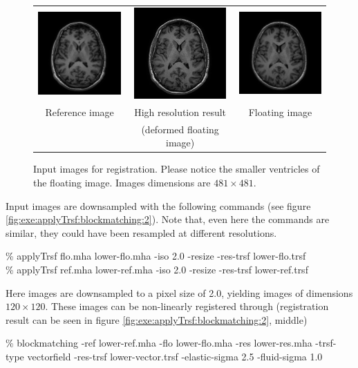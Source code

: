 \begin{figure}[ht]
\begin{center}
\begin{tabular}{ccc}
\includegraphics[width=35mm]{use-examples/applyTrsf-blockmatching/ref.png} &
\includegraphics[width=35mm]{use-examples/applyTrsf-blockmatching/res.png} & 
\includegraphics[width=35mm]{use-examples/applyTrsf-blockmatching/flo.png} \\
Reference image &
High resolution result &
Floating image \\
& (deformed floating image) &
\end{tabular}
\end{center}
\caption{\label{fig:exe:applyTrsf:blockmatching:1} Input images for registration. Please notice the smaller ventricles of the floating image. Images dimensions are $481 \times 481$.}
\end{figure}

Input images are downsampled with the following commands (see figure \ref{fig:exe:applyTrsf:blockmatching:2}). Note that, even here the commands are similar, they could have been resampled at different resolutions.
\begin{code}{1}
\% applyTrsf flo.mha lower-flo.mha -iso 2.0 -resize -res-trsf lower-flo.trsf \\
\% applyTrsf ref.mha lower-ref.mha -iso 2.0 -resize -res-trsf lower-ref.trsf
\end{code}
Here images are downsampled to a pixel size of 2.0, yielding images of dimensions $120 \times 120$. These images can be non-linearly registered through  (registration result can be seen in figure \ref{fig:exe:applyTrsf:blockmatching:2}, middle)
\begin{code}{1}
\% blockmatching -ref lower-ref.mha -flo lower-flo.mha -res lower-res.mha -trsf-type vectorfield -res-trsf lower-vector.trsf -elastic-sigma 2.5 -fluid-sigma 1.0
\end{code}


